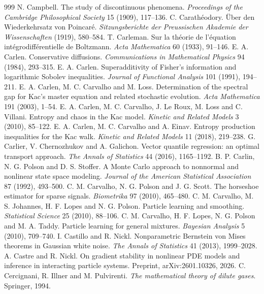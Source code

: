 \begin{thebibliography}{999}
 N. Campbell. The study of discontinuous phenomena. \emph{Proceedings of the Cambridge Philosophical Society} 15 (1909), 117--136.
 C. Carath\'eodory. \"Uber den Wiederkehrsatz von Poincar\'e. \emph{Sitzungsberichte der Preussischen Akademie der Wissenschaften} (1919), 580--584.
 T. Carleman. Sur la th\'eorie de l'\'equation int\'egrodiff\'erentielle de Boltzmann. \emph{Acta Mathematica} 60 (1933), 91--146.
 E. A. Carlen. Conservative diffusions. \emph{Communications in Mathematical Physics} 94 (1984), 293--315.
 E. A. Carlen. Superadditivity of Fisher's information and logarithmic Sobolev inequalities. \emph{Journal of Functional Analysis} 101 (1991), 194--211.
 E. A. Carlen, M. C. Carvalho and M. Loss. Determination of the spectral gap for Kac's master equation and related stochastic evolution. \emph{Acta Mathematica} 191 (2003), 1--54.
 E. A. Carlen, M. C. Carvalho, J. Le Roux, M. Loss and C. Villani. Entropy and chaos in the Kac model. \emph{Kinetic and Related Models} 3 (2010), 85--122.
 E. A. Carlen, M. C. Carvalho and A. Einav. Entropy production inequalities for the Kac walk. \emph{Kinetic and Related Models} 11 (2018), 219--238.
 G. Carlier, V. Chernozhukov and A. Galichon. Vector quantile regression: an optimal transport approach. \emph{The Annals of Statistics} 44 (2016), 1165--1192.
 B. P. Carlin, N. G. Polson and D. S. Stoffer. A Monte Carlo approach to nonnormal and nonlinear state space modeling. \emph{Journal of the American Statistical Association} 87 (1992), 493--500.
 C. M. Carvalho, N. G. Polson and J. G. Scott. The horseshoe estimator for sparse signals. \emph{Biometrika} 97 (2010), 465--480.
 C. M. Carvalho, M. S. Johannes, H. F. Lopes and N. G. Polson. Particle learning and smoothing. \emph{Statistical Science} 25 (2010), 88--106.
 C. M. Carvalho, H. F. Lopes, N. G. Polson and M. A. Taddy. Particle learning for general mixtures. \emph{Bayesian Analysis} 5 (2010), 709--740.
 I. Castillo and R. Nickl. Nonparametric Bernstein von Mises theorems in Gaussian white noise. \emph{The Annals of Statistics} 41 (2013), 1999--2028.
 A. Castre and R. Nickl. On gradient stability in nonlinear PDE models and inference in interacting particle systems. Preprint, arXiv:2601.10326, 2026.
 C. Cercignani, R. Illner and M. Pulvirenti. \emph{The mathematical theory of dilute gases}. Springer, 1994.

\end{thebibliography}
